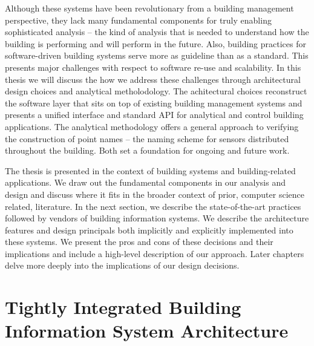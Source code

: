 Although these systems have been revolutionary from a building management perspective, they lack many fundamental components for
truly enabling sophisticated analysis -- the kind of analysis that is needed to understand how the building is performing
and will perform in the future.  Also, building practices for software-driven building systems serve more as guideline than
 as a standard.  This presents major challenges with respect to software re-use and scalability.  In this thesis
we will discuss the how we address these challenges through architectural design choices and analytical metholodology.  
The achitectural choices reconstruct the software layer that sits on top of existing building management systems and presents
a unified interface and standard API for analytical and control building applications.
The analytical methodology offers a general approach to verifying the construction of point names -- the naming scheme for 
sensors distributed throughout the building.  Both set a foundation for ongoing and future work.

The thesis is presented in the context of building systems and building-related applications.  We draw out the fundamental 
components in our analysis and design and discuss where it fits in the broader context of prior, computer science related,
literature.  In the next section, we describe the state-of-the-art practices followed by vendors of building information systems.
We describe the architecture features and design principals both implicitly and explicitly implemented into these systems.
We present the pros and cons of these decisions and their implications and include a high-level description of our approach.
Later chapters delve more deeply into the implications of our design decisions.

\section{Tightly Integrated Building Information System Architecture}

